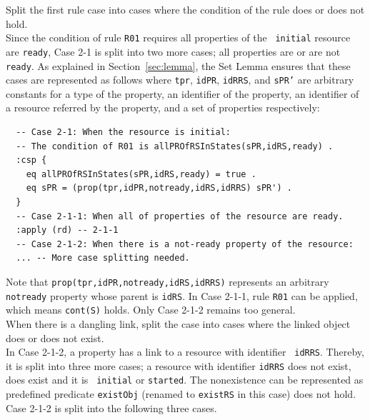 \documentclass[12pt]{report}
\newcommand{\stt}[1]{{\small{\tt {#1}}}}
\begin{document}
 Split the first rule case into cases where
the condition of the rule does or does not hold. \\ Since the
condition of rule {\tt R01} requires all properties of the {\tt
  initial} resource are {\tt ready}, Case 2-1 is split into two more
cases; all properties are or are not {\tt ready}. As explained in
Section~\ref{sec:lemma}, the Set Lemma ensures that these cases are
represented as follows where {\tt tpr}, {\tt idPR}, {\tt idRRS}, and
{\tt sPR'} are arbitrary constants for a type of the property, an
identifier of the property, an identifier of a resource referred by
the property, and a set of properties respectively:
\small
\begin{verbatim}
  -- Case 2-1: When the resource is initial:
  -- The condition of R01 is allPROfRSInStates(sPR,idRS,ready) .
  :csp { 
    eq allPROfRSInStates(sPR,idRS,ready) = true .
    eq sPR = (prop(tpr,idPR,notready,idRS,idRRS) sPR') .
  }
  -- Case 2-1-1: When all of properties of the resource are ready.
  :apply (rd) -- 2-1-1
  -- Case 2-1-2: When there is a not-ready property of the resource:
  ... -- More case splitting needed.
\end{verbatim}
\normalsize
Note that \stt{prop(tpr,idPR,notready,idRS,idRRS)} represents an
arbitrary {\tt notready} property whose parent is {\tt idRS}. In Case
2-1-1, rule {\tt R01} can be applied, which means \stt{cont(S)} holds. Only
Case 2-1-2 remains too general.\\

 When there is a dangling link, split the case
into cases where the linked object does or does not exist. \\ In Case
2-1-2, a property has a link to a resource with identifier {\tt
  idRRS}. Thereby, it is split into three more cases; a resource with
identifier {\tt idRRS} does not exist, does exist and it is {\tt
  initial} or {\tt started}. The nonexistence can be represented as
predefined predicate {\tt existObj} (renamed to {\tt existRS} in this
case) does not hold. Case 2-1-2 is split into the following three
cases.
\end{document}

